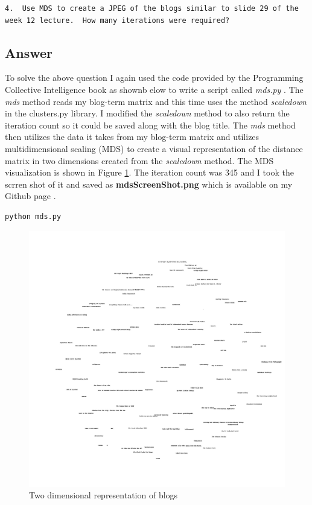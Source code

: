 \documentclass[letterpaper,11pt]{article}
\begin{document}
\begin{verbatim}
4.  Use MDS to create a JPEG of the blogs similar to slide 29 of the 
week 12 lecture.  How many iterations were required?
\end{verbatim}

\subsection*{Answer}

To solve the above question I again used the code provided by the Programming Collective Intelligence book as shownb elow  to write a script  called \textit{mds.py} \cite{collectiveIntell}. The \textit{mds} method reads my blog-term matrix and this time uses the method \textit{scaledown} in the clusters.py library. I modified the \textit{scaledown} method to also return the iteration count so it could be saved along with the blog title. The \textit{mds} method then utilizes the data it takes from my blog-term matrix and utilizes multidimensional scaling (MDS) to create a visual representation of the distance matrix in two dimensions created from the \textit{scaledown} method. The MDS visualization is shown in Figure \ref{fig:mds}. The iteration count was 345  and  I took the scrren shot of it and saved as \textbf{mdsScreenShot.png} which is available on my Github page \cite{github}.
\begin{lstlisting}[frame=single]
python mds.py
\end{lstlisting}

 \begin{figure}[h]
 \centering
 \includegraphics[scale=0.2]{mds}
 \caption{Two dimensional representation of blogs}
 \label{fig:mds}
 \end{figure}
\end{document}
